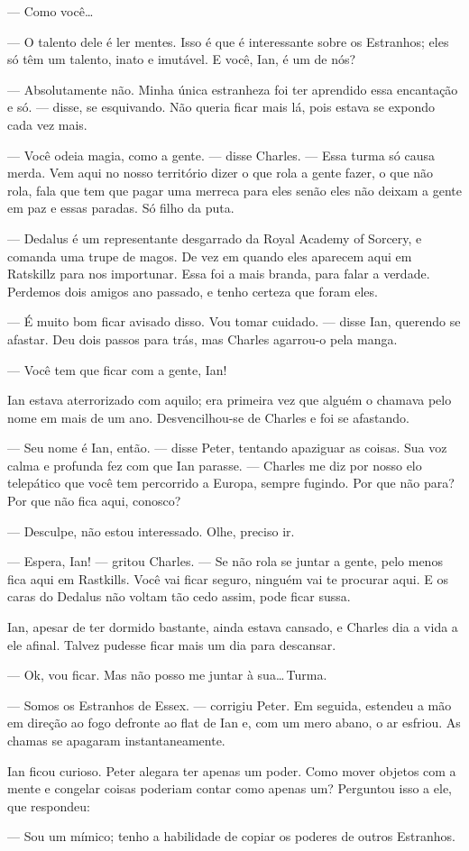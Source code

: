 --- Como você\ldots

--- O talento dele é ler mentes. Isso é que é interessante sobre os
Estranhos; eles só têm um talento, inato e imutável. E você, Ian, é um
de nós?

--- Absolutamente não. Minha única estranheza foi ter aprendido essa
encantação e só. --- disse, se esquivando. Não queria ficar mais lá,
pois estava se expondo cada vez mais.

--- Você odeia magia, como a gente. --- disse Charles. --- Essa turma só
causa merda. Vem aqui no nosso território dizer o que rola a gente
fazer, o que não rola, fala que tem que pagar uma merreca para eles
senão eles não deixam a gente em paz e essas paradas. Só filho da puta.

--- Dedalus é um representante desgarrado da Royal Academy of Sorcery, e
comanda uma trupe de magos. De vez em quando eles aparecem aqui em
Ratskillz para nos importunar. Essa foi a mais branda, para falar a
verdade. Perdemos dois amigos ano passado, e tenho certeza que foram
eles.

--- É muito bom ficar avisado disso. Vou tomar cuidado. --- disse Ian,
querendo se afastar. Deu dois passos para trás, mas Charles agarrou-o
pela manga.

--- Você tem que ficar com a gente, Ian!

Ian estava aterrorizado com aquilo; era primeira vez que alguém o
chamava pelo nome em mais de um ano. Desvencilhou-se de Charles e foi se
afastando.

--- Seu nome é Ian, então. --- disse Peter, tentando apaziguar as
coisas. Sua voz calma e profunda fez com que Ian parasse. --- Charles me
diz por nosso elo telepático que você tem percorrido a Europa, sempre
fugindo. Por que não para? Por que não fica aqui, conosco?

--- Desculpe, não estou interessado. Olhe, preciso ir.

--- Espera, Ian! --- gritou Charles. --- Se não rola se juntar a gente,
pelo menos fica aqui em Rastkills. Você vai ficar seguro, ninguém vai te
procurar aqui. E os caras do Dedalus não voltam tão cedo assim, pode
ficar sussa.

Ian, apesar de ter dormido bastante, ainda estava cansado, e Charles dia
a vida a ele afinal. Talvez pudesse ficar mais um dia para descansar.

--- Ok, vou ficar. Mas não posso me juntar à sua\ldots\,Turma.

--- Somos os Estranhos de Essex. --- corrigiu Peter. Em seguida,
estendeu a mão em direção ao fogo defronte ao flat de Ian e, com um mero
abano, o ar esfriou. As chamas se apagaram instantaneamente.

Ian ficou curioso. Peter alegara ter apenas um poder. Como mover objetos
com a mente e congelar coisas poderiam contar como apenas um? Perguntou
isso a ele, que respondeu:

--- Sou um mímico; tenho a habilidade de copiar os poderes de outros
Estranhos.
